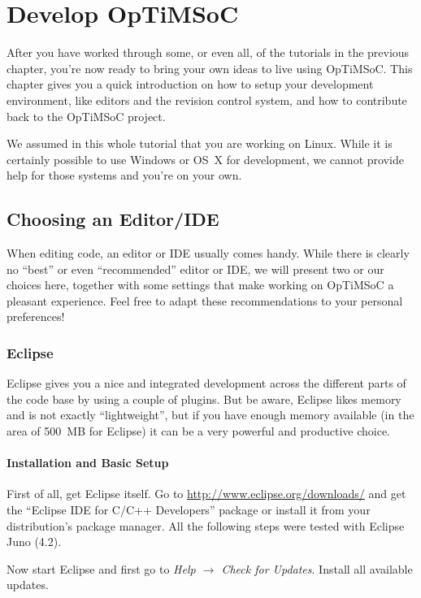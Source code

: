 \chapter{Develop OpTiMSoC}

After you have worked through some, or even all, of the tutorials in the
previous chapter, you're now ready to bring your own ideas to live using
OpTiMSoC. This chapter gives you a quick introduction on how to setup your
development environment, like editors and the revision control system, and how
to contribute back to the OpTiMSoC project.

We assumed in this whole tutorial that you are working on Linux. While it is
certainly possible to use Windows or OS~X for development, we cannot provide
help for those systems and you're on your own.

\section{Choosing an Editor/IDE}

When editing code, an editor or IDE usually comes handy. While there is clearly
no ``best'' or even ``recommended'' editor or IDE, we will present two or our
choices here, together with some settings that make working on OpTiMSoC a
pleasant experience. Feel free to adapt these recommendations to your personal
preferences!

\subsection{Eclipse}

Eclipse gives you a nice and integrated development across the different parts
of the code base by using a couple of plugins. But be aware, Eclipse likes
memory and is not exactly ``lightweight'', but if you have enough memory
available (in the area of 500~MB for Eclipse) it can be a very powerful and
productive choice.

\subsubsection{Installation and Basic Setup}

First of all, get Eclipse itself. Go to \url{http://www.eclipse.org/downloads/}
and get the ``Eclipse IDE for C/C++ Developers'' package or install it from
your distribution's package manager. All the following steps were tested with
Eclipse Juno (4.2).

Now start Eclipse and first go to \emph{Help $\rightarrow$ Check for Updates}.
Install all available updates.

